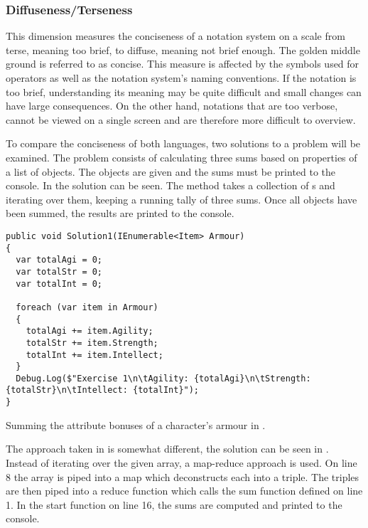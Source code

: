 \subsubsection{Diffuseness/Terseness} %
This dimension measures the conciseness of a notation system on a scale from terse, meaning too brief, to diffuse, meaning not brief enough. The golden middle ground is referred to as concise. This measure is affected by the symbols used for operators as well as the notation system's naming conventions. If the notation is too brief, understanding its meaning may be quite difficult and small changes can have large consequences. On the other hand, notations that are too verbose, cannot be viewed on a single screen and are therefore more difficult to overview.

To compare the conciseness of both languages, two solutions to a problem will be examined. The problem consists of calculating three sums based on properties of a list of objects. The objects are given and the sums must be printed to the console. In  the \cs solution can be seen. The method takes a collection of s and iterating over them, keeping a running tally of three sums. Once all objects have been summed, the results are printed to the console.

\begin{listing}[H]
\begin{verbatim}
public void Solution1(IEnumerable<Item> Armour)
{
  var totalAgi = 0;
  var totalStr = 0;
  var totalInt = 0;

  foreach (var item in Armour)
  {
    totalAgi += item.Agility;
    totalStr += item.Strength;
    totalInt += item.Intellect;
  }
  Debug.Log($"Exercise 1\n\tAgility: {totalAgi}\n\tStrength: {totalStr}\n\tIntellect: {totalInt}");
}
\end{verbatim}
\caption{Summing the attribute bonuses of a character's armour in \cs.}
\label{lst:cs-armour}
\end{listing}

The approach taken in \fs is somewhat different, the solution can be seen in . Instead of iterating over the given array, a map-reduce approach is used. On line 8 the array is piped into a map which deconstructs each  into a triple. The triples are then piped into a reduce function which calls the sum function defined on line 1. In the start function on line 16, the sums are computed and printed to the console.

